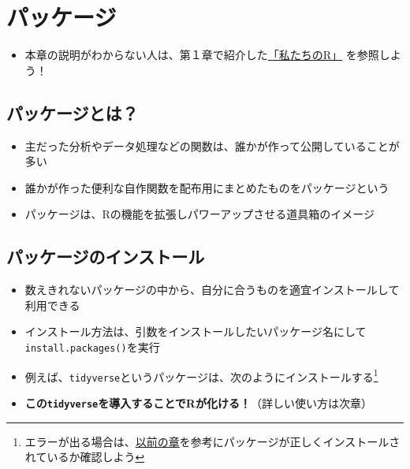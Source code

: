 \documentclass[
]{book}
\providecommand{\tightlist}{%
  \setlength{\itemsep}{0pt}\setlength{\parskip}{0pt}}
\begin{document}
\hypertarget{ux30d1ux30c3ux30b1ux30fcux30b8}{%
\chapter{パッケージ}\label{ux30d1ux30c3ux30b1ux30fcux30b8}}

\begin{itemize}
\tightlist
\item
  本章の説明がわからない人は、第１章で紹介した\href{https://www.jaysong.net/RBook/datahandling1.html}{「私たちのR」} を参照しよう！
\end{itemize}

\hypertarget{ux30d1ux30c3ux30b1ux30fcux30b8ux3068ux306f}{%
\section{パッケージとは？}\label{ux30d1ux30c3ux30b1ux30fcux30b8ux3068ux306f}}

\begin{itemize}
\tightlist
\item
  主だった分析やデータ処理などの関数は、誰かが作って公開していることが多い
\item
  誰かが作った便利な自作関数を配布用にまとめたものをパッケージという
\item
  パッケージは、Rの機能を拡張しパワーアップさせる道具箱のイメージ
\end{itemize}

\hypertarget{ux30d1ux30c3ux30b1ux30fcux30b8ux306eux30a4ux30f3ux30b9ux30c8ux30fcux30eb}{%
\section{パッケージのインストール}\label{ux30d1ux30c3ux30b1ux30fcux30b8ux306eux30a4ux30f3ux30b9ux30c8ux30fcux30eb}}

\begin{itemize}
\tightlist
\item
  数えきれないパッケージの中から、自分に合うものを適宜インストールして利用できる
\item
  インストール方法は、引数をインストールしたいパッケージ名にして\texttt{install.packages()}を実行
\item
  例えば、\texttt{tidyverse}というパッケージは、次のようにインストールする\footnote{エラーが出る場合は、\protect\hyperlink{ux30d1ux30c3ux30b1ux30fcux30b8ux306eux30a4ux30f3ux30b9ux30c8ux30fcux30eb}{以前の章}を参考にパッケージが正しくインストールされているか確認しよう}
\item
  \textbf{この\texttt{tidyverse}を導入することでRが化ける！}（詳しい使い方は次章）
\end{itemize}
\end{document}
